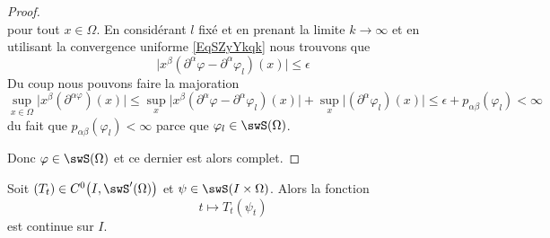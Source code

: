 \begin{proof}
\begin{equation}
    \end{equation}
    pour tout \( x\in\Omega\). En considérant \( l\) fixé et en prenant la limite \( k\to \infty\) et en utilisant la convergence uniforme \eqref{EqSZyYkqk} nous trouvons que
    \begin{equation}
        \big| x^{\beta}(\partial^{\alpha}\varphi-\partial^{\alpha}\varphi_l)(x) \big|\leq \epsilon
    \end{equation}
    Du coup nous pouvons faire la majoration
    \begin{equation}
        \sup_{x\in\Omega}\big| x^{\beta}(\partial^{\alpha\varphi})(x) \big|\leq\sup_x\big| x^{\beta}(\partial^{\alpha}\varphi-\partial^{\alpha}\varphi_l)(x) \big|+\sup_x\big| (\partial^{\alpha}\varphi_l)(x) \big|\leq\epsilon+p_{\alpha\beta}(\varphi_l)<\infty
    \end{equation}
    du fait que \( p_{\alpha\beta}(\varphi_l)<\infty\) parce que \( \varphi_l\in\swS(\Omega)\).

    Donc \( \varphi\in\swS(\Omega)\) et ce dernier est alors complet.
\end{proof}

\begin{proposition}
    Soit \( (T_t)\in C^0\big( I,\swS'(\Omega) \big)\) et \( \psi\in\swS(I\times \Omega)\). Alors la fonction
    \begin{equation}    \label{EqULcaYjm}
        t\mapsto T_t(\psi_t)
    \end{equation}
    est continue sur \( I\).
\end{proposition}

